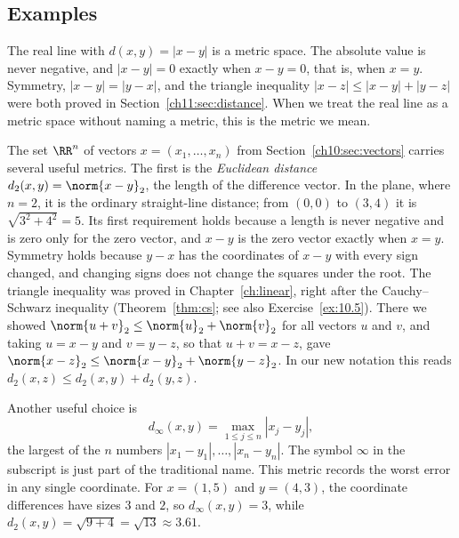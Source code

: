 
\subsection*{Examples}
The real line with $d(x,y)=|x-y|$ is a metric space. The absolute value is never negative, and $|x-y|=0$ exactly when $x-y=0$, that is, when $x=y$. Symmetry, $|x-y|=|y-x|$, and the triangle inequality $|x-z|\le|x-y|+|y-z|$ were both proved in Section~\ref{ch11:sec:distance}. When we treat the real line as a metric space without naming a metric, this is the metric we mean.

The set $\RR^n$ of vectors $x=(x_1,\ldots,x_n)$ from Section~\ref{ch10:sec:vectors} carries several useful metrics. The first is the \emph{Euclidean distance} $d_2(x,y)=\norm{x-y}_2$, the length of the difference vector. In the plane, where $n=2$, it is the ordinary straight-line distance; from $(0,0)$ to $(3,4)$ it is $\sqrt{3^2+4^2}=5$. Its first requirement holds because a length is never negative and is zero only for the zero vector, and $x-y$ is the zero vector exactly when $x=y$. Symmetry holds because $y-x$ has the coordinates of $x-y$ with every sign changed, and changing signs does not change the squares under the root. The triangle inequality was proved in Chapter~\ref{ch:linear}, right after the Cauchy--Schwarz inequality (Theorem~\ref{thm:cs}; see also Exercise~\ref{ex:10.5}). There we showed $\norm{u+v}_2\le\norm{u}_2+\norm{v}_2$ for all vectors $u$ and $v$, and taking $u=x-y$ and $v=y-z$, so that $u+v=x-z$, gave $\norm{x-z}_2\le\norm{x-y}_2+\norm{y-z}_2$. In our new notation this reads $d_2(x,z)\le d_2(x,y)+d_2(y,z)$.

Another useful choice is
\[
d_\infty(x,y)=\max_{1\le j\le n}|x_j-y_j|,
\]
the largest of the $n$ numbers $|x_1-y_1|,\ldots,|x_n-y_n|$. The symbol $\infty$ in the subscript is just part of the traditional name. This metric records the worst error in any single coordinate. For $x=(1,5)$ and $y=(4,3)$, the coordinate differences have sizes $3$ and $2$, so $d_\infty(x,y)=3$, while $d_2(x,y)=\sqrt{9+4}=\sqrt{13}\approx3.61$.


